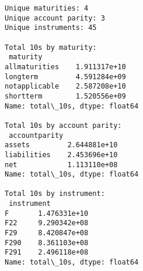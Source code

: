\documentclass[11pt]{article}
\begin{document}
    \begin{Verbatim}[commandchars=\\\{\}]
Unique maturities: 4
Unique account parity: 3
Unique instruments: 45

Total 10s by maturity:
 maturity
allmaturities    1.911317e+10
longterm         4.591284e+09
notapplicable    2.587208e+10
shortterm        1.520556e+09
Name: total\_10s, dtype: float64

Total 10s by account parity:
 accountparity
assets         2.644881e+10
liabilities    2.453696e+10
net            1.113110e+08
Name: total\_10s, dtype: float64

Total 10s by instrument:
 instrument
F       1.476331e+10
F22     9.290342e+08
F29     8.420847e+08
F290    8.361103e+08
F291    2.496118e+08
Name: total\_10s, dtype: float64
    \end{Verbatim}
\end{document}
